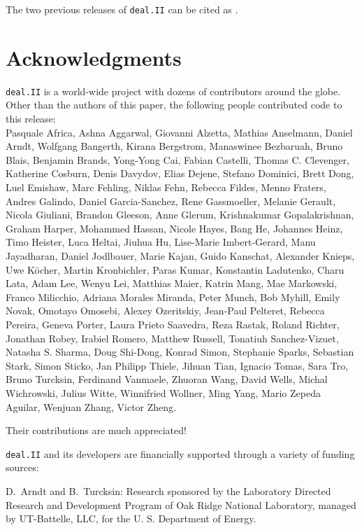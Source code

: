 \documentclass{ansarticle-preprint}
\newcommand{\specialword}[1]{\texttt{#1}}
\newcommand{\dealii}{{\specialword{deal.II}}\xspace}
\begin{document}
The two previous releases of \dealii{} can be cited as
\cite{dealII90,dealII91}.


\section{Acknowledgments}

\dealii{} is a world-wide project with dozens of contributors around the
globe. Other than the authors of this paper, the following people
contributed code to this release:\\
%
%
Pasquale Africa,
Ashna Aggarwal,
Giovanni Alzetta,
Mathias Anselmann,
Daniel Arndt,
Wolfgang Bangerth,
Kirana Bergstrom,
Manaswinee Bezbaruah,
Bruno Blais,
Benjamin Brands,
Yong-Yong Cai,
Fabian Castelli,
Thomas C. Clevenger,
Katherine Cosburn,
Denis Davydov,
Elias Dejene,
Stefano Dominici,
Brett Dong,
Luel Emishaw,
Marc Fehling,
Niklas Fehn,
Rebecca Fildes,
Menno Fraters,
Andres Galindo,
Daniel Garcia-Sanchez,
Rene Gassmoeller,
Melanie Gerault,
Nicola Giuliani,
Brandon Gleeson,
Anne Glerum,
Krishnakumar Gopalakrishnan,
Graham Harper,
Mohammed Hassan,
Nicole Hayes,
Bang He,
Johannes Heinz,
Timo Heister,
Luca Heltai,
Jiuhua Hu,
Lise-Marie Imbert-Gerard,
Manu Jayadharan,
Daniel Jodlbauer,
Marie Kajan,
Guido Kanschat,
Alexander Knieps,
Uwe K{\"o}cher,
Martin Kronbichler,
Paras Kumar,
Konstantin Ladutenko,
Charu Lata,
Adam Lee,
Wenyu Lei,
Matthias Maier,
Katrin Mang,
Mae Markowski,
Franco Milicchio,
Adriana Morales Miranda,
Peter Munch,
Bob Myhill,
Emily Novak,
Omotayo Omosebi,
Alexey Ozeritskiy,
Jean-Paul Pelteret,
Rebecca Pereira,
Geneva Porter,
Laura Prieto Saavedra,
Reza Rastak,
Roland Richter,
Jonathan Robey,
Irabiel Romero,
Matthew Russell,
Tonatiuh Sanchez-Vizuet,
Natasha S. Sharma,
Doug Shi-Dong,
Konrad Simon,
Stephanie Sparks,
Sebastian Stark,
Simon Sticko,
Jan Philipp Thiele,
Jihuan Tian,
Ignacio Tomas,
Sara Tro,
Bruno Turcksin,
Ferdinand Vanmaele,
Zhuoran Wang,
David Wells,
Michal Wichrowski,
Julius Witte,
Winnifried Wollner,
Ming Yang,
Mario Zepeda Aguilar,
Wenjuan Zhang,
Victor Zheng.

Their contributions are much appreciated!


\bigskip

\dealii{} and its developers are financially supported through a
variety of funding sources:

D.~Arndt and B.~Turcksin: Research sponsored by the Laboratory Directed Research and
Development Program of Oak Ridge National Laboratory, managed by UT-Battelle,
LLC, for the U. S. Department of Energy.
\end{document}

